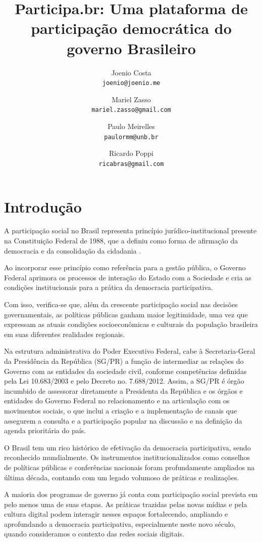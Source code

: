 \documentclass{article}
\title{
  Participa.br: Uma plataforma de participação democrática do governo Brasileiro
}
\author{
  Joenio Costa\\
  \texttt{joenio@joenio.me}
  \and
  Mariel Zasso\\
  \texttt{mariel.zasso@gmail.com}
  \and
  Paulo Meirelles\\
  \texttt{paulormm@unb.br}
  \and
  Ricardo Poppi\\
  \texttt{ricabras@gmail.com}
}
\begin{document}
\maketitle

\section{Introdução}


A participação social no Brasil representa princípio jurídico-institucional
presente na Constituição Federal de 1988, que a definiu como forma de afirmação
da democracia e da consolidação da cidadania \cite{ciconello_alexandre_participacao_2008}.

Ao incorporar esse princípio como referência para a gestão pública, o Governo
Federal aprimora os processos de interação do Estado com a Sociedade e cria as
condições institucionais para a prática da democracia participativa. 

Com isso, verifica-se que, além da crescente participação social nas decisões
governamentais, as políticas públicas ganham maior legitimidade, uma vez que
expressam as atuais condições socioeconômicas e culturais da população
brasileira em suas diferentes realidades regionais.

Na estrutura administrativa do Poder Executivo Federal, cabe à Secretaria-Geral
da Presidência da República (SG/PR) a função de intermediar as relações do
Governo com as entidades da sociedade civil, conforme competências definidas
pela Lei 10.683/2003 e pelo Decreto no. 7.688/2012. Assim, a SG/PR é órgão
incumbido de assessorar diretamente a Presidenta da República e os órgãos e
entidades do Governo Federal no relacionamento e na articulação com os
movimentos sociais, o que inclui a criação e a implementação de canais que
assegurem a consulta e a participação popular na discussão e na definição da
agenda prioritária do país.

O Brasil tem um rico histórico de efetivação da democracia participativa, sendo
reconhecido mundialmente. Os instrumentos institucionalizados como conselhos de
políticas públicas e conferências nacionais foram profundamente ampliados na
última década, contando com um legado volumoso de práticas e realizações. 

A maioria dos programas de governo já conta com participação social prevista em
pelo menos uma de suas etapas. As práticas trazidas pelas novas mídias e pela
cultura digital podem interagir nesses espaços fortalecendo, ampliando e
aprofundando a democracia participativa, especialmente neste novo século,
quando consideramos o contexto das redes sociais digitais.
\end{document}
